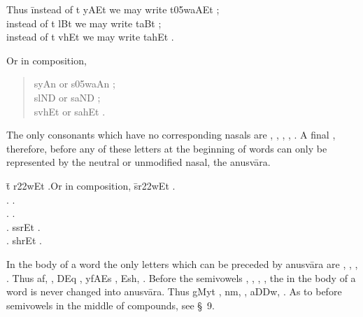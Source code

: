 \begin{tabbing}
  Thus \=instead of {\dn t\2 yAEt}  we may write {\dn t\305w\1aAEt}
  ;\\
  \>instead of {\dn t\2 lBt\?}  we may write
  {\dn t\1aBt\?} ;\\
  \>instead of {\dn t\2 vhEt}  we may write {\dn t\1ahEt}
  .\\
\end{tabbing}

\noindent Or in composition,

\begin{quote}
  {\dn s\2yAn\2}  or {\dn s\305w\1aAn\2} ;\\
  {\dn s\2lND\2}  or {\dn s\1aND\2} ;\\
  {\dn s\2vhEt}  or {\dn s\1ahEt} .\\
\end{quote}

\s The only consonants which have no corresponding nasals are {\dn {}}
, {\dn {}} , {\dn {}} , {\dn {}} , {\dn {}} . A final
{\dn {}} , therefore, before any of these letters at the beginning of
words can only be represented by the neutral or unmodified nasal, the
anusvāra.

\begin{tabbing}
  \hspace*{1cm}\={\dn t\2 r\322wEt} .\hspace*{1cm}Or in
  composition, \={\dn s\2r\322wEt} .\\
   .  .\\
   . 
  .\\
   . \> {\dn s\2srEt} .\\
   . \> {\dn s\2hrEt} .\\
\end{tabbing}

\s In the body of a word the only letters which can be preceded by
anusvāra are {\dn {}} , {\dn {}} , {\dn {}} , {\dn {}} . Thus
{\dn a\2f,} , {\dn D\2Eq} , {\dn yfA\2Es}
, {\dn Es\2h,} . Before the semivowels {\dn {}} ,
{\dn {}} , {\dn {}} , {\dn {}} , the {\dn {}}  in the body of a
word is never changed into anusvāra. Thus {\dn gMyt\?} ,
{\dn nm\5,} , {\dn a\3DDw,} . As to {\dn {}}  before
semivowels in the middle of compounds, see \S~9.

